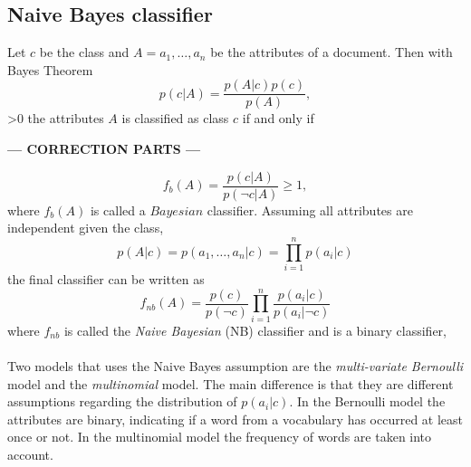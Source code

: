 \subsection{Naive Bayes classifier}
Let $c$ be the class and $A = a_1, \dots ,a_n$ be the attributes of a document. Then with Bayes Theorem
\begin{equation}
p(c|A)=\frac{p(A|c)p(c)}{p(A)},
\end{equation}
\ifnum\printdraft>0
		the attributes $A$ is classified as class $c$ if and only if
\else
\begin{center}
	\textbf{--- CORRECTION PARTS ---}
\end{center}
\fi
\begin{equation}
f_b(A)=\frac{p(c|A)}{p(\neg c|A)} \geq 1,
\end{equation}
where $f_b(A)$ is called a $Bayesian$ classifier. Assuming all attributes are independent given the class, 
\[
p(A|c)=p(a_1,\dots ,a_n | c) = \prod_{i=1}^n p(a_i|c)
\]
the final classifier can be written as
\begin{equation}
f_{nb}(A) = \frac{p(c)}{p(\neg c)}\prod_{i=1}^n\frac{p(a_i|c)}{p(a_i|\neg c)}
\end{equation}
where $f_{nb}$ is called the \emph{Naive Bayesian} (NB) classifier and is a binary classifier,  \\\\
Two models that uses the Naive Bayes assumption are the \emph{multi-variate Bernoulli} model and the \emph{multinomial} model. The main difference is that they are different assumptions regarding the distribution of $p(a_i|c)$. In the Bernoulli model the attributes are binary, indicating if a word from a vocabulary has occurred at least once or not. In the multinomial model the frequency of words are taken into account.